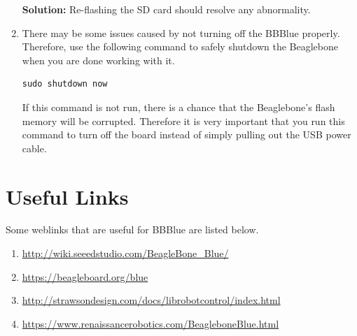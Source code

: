 \begin{enumerate}[\emph{T\#}1:]
    \textbf{Solution:}  Re-flashing the SD card should resolve any abnormality.

    
  \item There may be some issues caused by not turning off the BBBlue properly. Therefore, use the following command to safely shutdown the Beaglebone when you are done working with it.

\begin{verbatim}
sudo shutdown now
\end{verbatim}
    If this command is not run, there is a chance that the Beaglebone's flash memory will be corrupted. Therefore it is very important that you run this command to turn off the board instead of simply pulling out the USB power cable.

\end{enumerate}

\section{Useful Links}
\label{sec:useful-links}

Some weblinks that are useful for BBBlue are listed below. 

\begin{enumerate}
\item \href{http://wiki.seeedstudio.com/BeagleBone_Blue/}{http://wiki.seeedstudio.com/BeagleBone\_Blue/}
  
\item \href{https://beagleboard.org/blue}{https://beagleboard.org/blue}
  
\item \href{http://strawsondesign.com/docs/librobotcontrol/index.html}{http://strawsondesign.com/docs/librobotcontrol/index.html}
  
\item \href{https://www.renaissancerobotics.com/BeagleboneBlue.html}{https://www.renaissancerobotics.com/BeagleboneBlue.html}
\end{enumerate}



